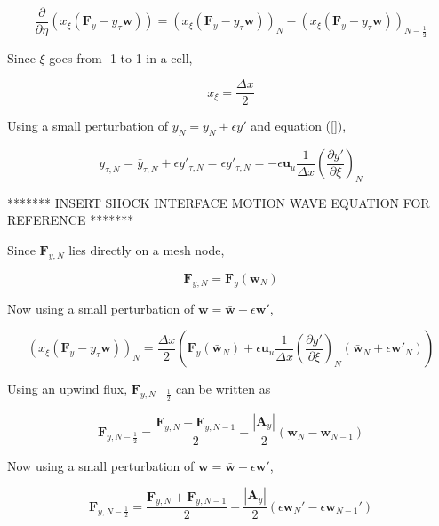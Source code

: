 \documentclass[10pt]{article}
\begin{document}
	$$ \frac{\partial}{\partial \eta} (x_\xi (\mathbf{F}_y - y_\tau \mathbf{w})) =  (x_\xi (\mathbf{F}_y - y_\tau \mathbf{w}))_{N} - (x_\xi (\mathbf{F}_y - y_\tau \mathbf{w}))_{N-\frac{1}{2}} $$
	
	Since $\xi$ goes from -1 to 1 in a cell,
	
	$$ x_{\xi}= \frac{\Delta x}{2} $$
	
	Using a small perturbation of $y_N = \bar{y}_N + \epsilon y'$ and equation (\ref{}), 
	
	$$ y_{\tau,N} = \bar{y}_{\tau,N} + \epsilon y'_{\tau,N} = \epsilon y'_{\tau,N} = - \epsilon \mathbf{u}_u \frac{1}{\Delta x} \left( \frac{\partial y'}{\partial \xi} \right)_N $$
	
	******* INSERT SHOCK INTERFACE MOTION WAVE EQUATION FOR REFERENCE *******
	
	Since $\mathbf{F}_{y,N}$ lies directly on a mesh node,
	
	$$ \mathbf{F}_{y,N} = \mathbf{F}_{y}(\bar{\mathbf{w}}_N) $$
	
	Now using a small perturbation of $\mathbf{w} = \bar{\mathbf{w}} + \epsilon \mathbf{w}'$,
	
	
	
	\begin{equation} \label{shock_term2_pt1}
		(x_\xi (\mathbf{F}_y - y_\tau \mathbf{w}))_{N} = \frac{\Delta x}{2} \left( \mathbf{F}_{y}(\bar{\mathbf{w}}_N) + \epsilon \mathbf{u}_u \frac{1}{\Delta x} \left( \frac{\partial y'}{\partial \xi} \right)_N (\bar{\mathbf{w}}_N + \epsilon \mathbf{w}'_N) \right)
	\end{equation}
	
	
	Using an upwind flux, $\mathbf{F}_{y,N-\frac{1}{2}}$ can be written as
	
	$$ \mathbf{F}_{y,N-\frac{1}{2}} = \frac{\mathbf{F}_{y,N} + \mathbf{F}_{y,N-1}}{2} - \frac{|\mathbf{A}_y|}{2}(\mathbf{w}_{N} - \mathbf{w}_{N-1})$$
	
	Now using a small perturbation of $\mathbf{w} = \bar{\mathbf{w}} + \epsilon \mathbf{w}'$, 
	
	$$ \mathbf{F}_{y,N-\frac{1}{2}} = \frac{\mathbf{F}_{y,N} + \mathbf{F}_{y,N-1}}{2} - \frac{|\mathbf{A}_y|}{2} (\epsilon \mathbf{w}_{N}' - \epsilon \mathbf{w}_{N-1}')$$
	
\end{document}
